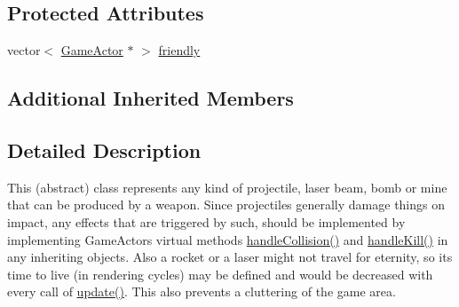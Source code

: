 \subsection*{Protected Attributes}
\begin{DoxyCompactItemize}
\item 
vector$<$ \hyperlink{class_game_actor}{Game\+Actor} $\ast$ $>$ \hyperlink{class_projectile_a54dec73f149e6619fac8f5cf8910edcc}{friendly}
\end{DoxyCompactItemize}
\subsection*{Additional Inherited Members}


\subsection{Detailed Description}
This (abstract) class represents any kind of projectile, laser beam, bomb or mine that can be produced by a weapon. Since projectiles generally damage things on impact, any effects that are triggered by such, should be implemented by implementing Game\+Actors virtual methods \hyperlink{class_game_actor_aba8cfb1004bf6fc17681cd595b706ada}{handle\+Collision()} and \hyperlink{class_game_actor_a00cdd692fae4de9fb4ce6b2748754744}{handle\+Kill()} in any inheriting objects. Also a rocket or a laser might not travel for eternity, so its time to live (in rendering cycles) may be defined and would be decreased with every call of \hyperlink{class_projectile_ac41ad56034b53e739619fabbd5e49652}{update()}. This also prevents a cluttering of the game area. 

